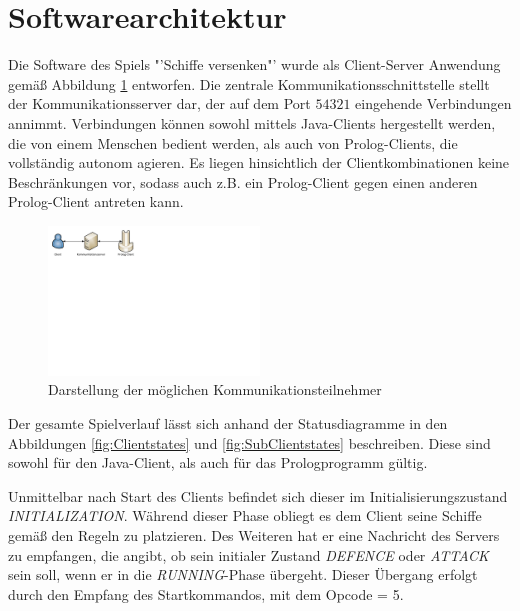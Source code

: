 \section{Softwarearchitektur} \label{sec:Softwarearchitektur}


Die Software des Spiels "'Schiffe versenken"' wurde als Client-Server Anwendung gemäß Abbildung \ref{fig:Kommunikationsteilnehmer} entworfen.
Die zentrale Kommunikationsschnittstelle stellt der Kommunikationsserver dar, der auf dem Port $54321$ eingehende Verbindungen annimmt.
Verbindungen können sowohl mittels Java-Clients hergestellt werden, die von einem Menschen bedient werden, als auch von Prolog-Clients, die vollständig autonom agieren.
Es liegen hinsichtlich der Clientkombinationen keine Beschränkungen vor, sodass auch z.B. ein Prolog-Client gegen einen anderen Prolog-Client antreten kann.

\begin{figure}[H]
  \centering
  \includegraphics[trim=0mm 165mm 175mm 0mm,clip,width=0.5\textwidth]{images/Kommunikationsmodell.pdf}
  \caption{Darstellung der möglichen Kommunikationsteilnehmer}
  \label{fig:Kommunikationsteilnehmer}
\end{figure}

Der gesamte Spielverlauf lässt sich anhand der Statusdiagramme in den Abbildungen \ref{fig:Clientstates} und \ref{fig:SubClientstates} beschreiben.
Diese sind sowohl für den Java-Client, als auch für das Prologprogramm gültig.

Unmittelbar nach Start des Clients befindet sich dieser im Initialisierungszustand \emph{INITIALIZATION}.
Während dieser Phase obliegt es dem Client seine Schiffe gemäß den Regeln zu platzieren.
Des Weiteren hat er eine Nachricht des Servers zu empfangen, die angibt, ob sein initialer Zustand \emph{DEFENCE} oder \emph{ATTACK} sein soll, wenn er in die \emph{RUNNING}-Phase übergeht.
Dieser Übergang erfolgt durch den Empfang des Startkommandos, mit dem Opcode = 5.

